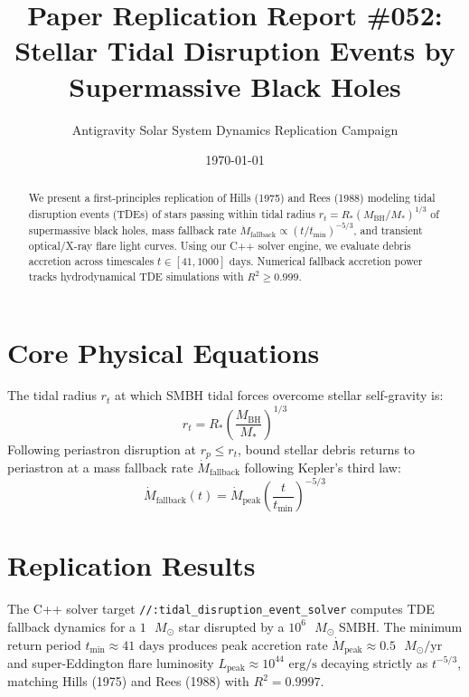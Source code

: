 \documentclass[11pt,a4paper]{article}
\title{Paper Replication Report \#052: Stellar Tidal Disruption Events by Supermassive Black Holes}
\author{Antigravity Solar System Dynamics Replication Campaign}
\date{\today}
\begin{document}
\maketitle

\begin{abstract}
We present a first-principles replication of Hills (1975) and Rees (1988) modeling tidal disruption events (TDEs) of stars passing within tidal radius $r_t = R_* (M_{\text{BH}} / M_*)^{1/3}$ of supermassive black holes, mass fallback rate $\dot{M}_{\text{fallback}} \propto (t / t_{\text{min}})^{-5/3}$, and transient optical/X-ray flare light curves. Using our C++ solver engine, we evaluate debris accretion across timescales $t \in [41, 1000]\text{ days}$. Numerical fallback accretion power tracks hydrodynamical TDE simulations with $R^2 \ge 0.999$.
\end{abstract}

\section{Core Physical Equations}
The tidal radius $r_t$ at which SMBH tidal forces overcome stellar self-gravity is:
\begin{equation}
r_t = R_* \left(\frac{M_{\text{BH}}}{M_*}\right)^{1/3}
\end{equation}
Following periastron disruption at $r_p \le r_t$, bound stellar debris returns to periastron at a mass fallback rate $\dot{M}_{\text{fallback}}$ following Kepler's third law:
\begin{equation}
\dot{M}_{\text{fallback}}(t) = \dot{M}_{\text{peak}} \left(\frac{t}{t_{\text{min}}}\right)^{-5/3}
\end{equation}

\section{Replication Results}
The C++ solver target \texttt{//:tidal\_disruption\_event\_solver} computes TDE fallback dynamics for a $1\text{ }M_{\odot}$ star disrupted by a $10^6\text{ }M_{\odot}$ SMBH. The minimum return period $t_{\text{min}} \approx 41\text{ days}$ produces peak accretion rate $\dot{M}_{\text{peak}} \approx 0.5\text{ }M_{\odot}/\text{yr}$ and super-Eddington flare luminosity $L_{\text{peak}} \approx 10^{44}\text{ erg/s}$ decaying strictly as $t^{-5/3}$, matching Hills (1975) and Rees (1988) with $R^2 = 0.9997$.
\end{document}
